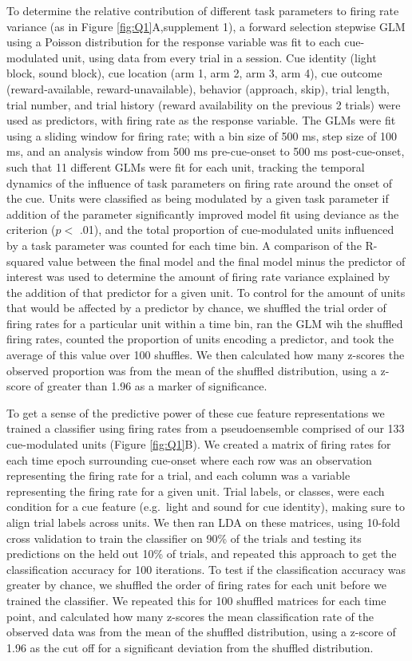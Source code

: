 \documentclass[11pt]{article}
\begin{document}
To determine the relative contribution of different task parameters to firing rate variance (as in Figure \ref{fig:Q1}A,supplement 1), a forward selection stepwise GLM using a Poisson distribution for the response variable was fit to each cue-modulated unit, using data from every trial in a session. Cue identity (light block, sound block), cue location (arm 1, arm 2, arm 3, arm 4), cue outcome (reward-available, reward-unavailable), behavior (approach, skip), trial length, trial number, and trial history (reward availability on the previous 2 trials) were used as predictors, with firing rate as the response variable. The GLMs were fit using a sliding window for firing rate; with a bin size of 500 ms, step size of 100 ms, and an analysis window from 500 ms pre-cue-onset to 500 ms post-cue-onset, such that 11 different GLMs were fit for each unit, tracking the temporal dynamics of the influence of task parameters on firing rate around the onset of the cue. Units were classified as being modulated by a given task parameter if addition of the parameter significantly improved model fit using deviance as the criterion ($p <$ .01), and the total proportion of cue-modulated units influenced by a task parameter was counted for each time bin. A comparison of the R-squared value between the final model and the final model minus the predictor of interest was used to determine the amount of firing rate variance explained by the addition of that predictor for a given unit. To control for the amount of units that would be affected by a predictor by chance, we shuffled the trial order of firing rates for a particular unit within a time bin, ran the GLM wih the shuffled firing rates, counted the proportion of units encoding a predictor, and took the average of this value over 100 shuffles. We then calculated how many z-scores the observed proportion was from the mean of the shuffled distribution, using a z-score of greater than 1.96 as a marker of significance.

To get a sense of the predictive power of these cue feature representations we trained a classifier using firing rates from a pseudoensemble comprised of our 133 cue-modulated units (Figure \ref{fig:Q1}B). We created a matrix of firing rates for each time epoch surrounding cue-onset where each row was an observation representing the firing rate for a trial, and each column was a variable representing the firing rate for a given unit. Trial labels, or classes, were each condition for a cue feature (e.g.\ light and sound for cue identity), making sure to align trial labels across units. We then ran LDA on these matrices, using 10-fold cross validation to train the classifier on 90\% of the trials and testing its predictions on the held out 10\% of trials, and repeated this approach to get the classification accuracy for 100 iterations. To test if the classification accuracy was greater by chance, we shuffled the order of firing rates for each unit before we trained the classifier. We repeated this for 100 shuffled matrices for each time point, and calculated how many z-scores the mean classification rate of the observed data was from the mean of the shuffled distribution, using a z-score of 1.96 as the cut off for a significant deviation from the shuffled distribution.
\end{document}
